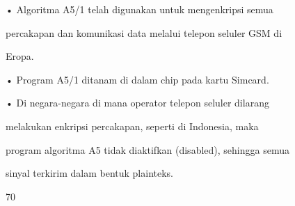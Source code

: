 \documentclass{article}
\begin{document}

• Algoritma A5/1 telah digunakan untuk mengenkripsi semua 

percakapan dan komunikasi data melalui telepon seluler GSM di 

Eropa. 

• Program A5/1 ditanam di dalam chip pada kartu Simcard. 

• Di negara-negara di mana operator telepon seluler dilarang 

melakukan enkripsi percakapan, seperti di Indonesia, maka 

program algoritma A5 tidak diaktifkan (disabled), sehingga semua 

sinyal terkirim dalam bentuk plainteks.

70
\end{document}
